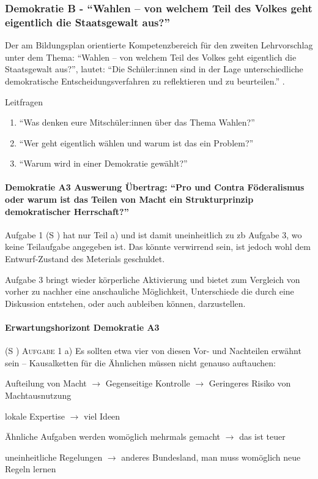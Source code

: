 \subsubsection{Demokratie B - \enquote{Wahlen – von welchem Teil des Volkes geht eigentlich die Staatsgewalt aus?}}
Der am Bildungsplan orientierte Kompetenzbereich für den zweiten Lehrvorschlag unter dem Thema: \enquote{Wahlen – von welchem Teil des Volkes geht eigentlich die Staatsgewalt aus?}, lautet: \enquote{Die Schüler:innen sind in der Lage unterschiedliche demokratische Entscheidungsverfahren zu reflektieren und zu beurteilen.} \autocite[][16]{bplan}.

Leitfragen
\begin{enumerate}
    \item \enquote{Was denken eure Mitschüler:innen über das Thema Wahlen?}
    \item \enquote{Wer geht eigentlich wählen und warum ist das ein Problem?}
    \item \enquote{Warum wird in einer Demokratie gewählt?}
\end{enumerate}

\paragraph{Demokratie A3 Auswerung Übertrag: \enquote{Pro und Contra Föderalismus oder warum ist das Teilen von Macht ein Strukturprinzip demokratischer Herrschaft?}}
Aufgabe 1 (\gls{S} \pageref{DEMOKRATIE-A3}) hat nur Teil a) und ist damit uneinheitlich zu \gls{zb} Aufgabe 3, wo keine Teilaufgabe angegeben ist. Das könnte verwirrend sein, ist jedoch wohl dem Entwurf-Zustand des Meterials geschuldet. 

Aufgabe 3 bringt wieder körperliche Aktivierung und bietet zum Vergleich von vorher zu nachher eine anschauliche Möglichkeit, Unterschiede die durch eine Diskussion entstehen, oder auch aubleiben können, darzustellen. 





\paragraph{Erwartungshorizont Demokratie A3} (\gls{S} \pageref{DEMOKRATIE-A3})
\textsc{Aufgabe 1} a) \quad
Es sollten etwa vier von diesen Vor- und Nachteilen erwähnt sein -- Kausalketten für die Ähnlichen müssen nicht genauso auftauchen:
 \begin{myitemize}
    \item Aufteilung von Macht $\rightarrow$ Gegenseitige Kontrolle $\rightarrow$ Geringeres Risiko von Machtausnutzung
    \item lokale Expertise $\rightarrow$ viel Ideen
    \item Ähnliche Aufgaben werden womöglich mehrmals gemacht $\rightarrow$ das ist teuer
    \item uneinheitliche Regelungen $\rightarrow$ anderes Bundesland, man muss womöglich neue Regeln lernen
 \end{myitemize}

